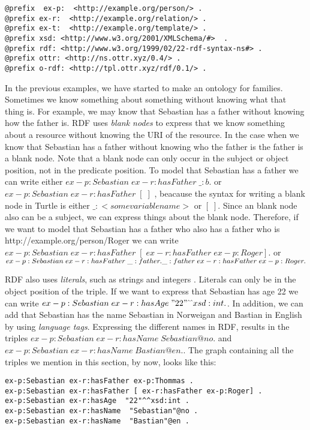\begin{lstlisting}[frame=single, language=turtle]
@prefix  ex-p:  <http://example.org/person/> . 
@prefix ex-r:  <http://example.org/relation/> . 
@prefix ex-t:  <http://example.org/template/> . 
@prefix xsd: <http://www.w3.org/2001/XMLSchema/#>  . 
@prefix rdf: <http://www.w3.org/1999/02/22-rdf-syntax-ns#> .
@prefix ottr: <http://ns.ottr.xyz/0.4/> .
@prefix o-rdf: <http://tpl.ottr.xyz/rdf/0.1/> .
\end{lstlisting}

\para
In the previous examples, we have started to make an ontology for families. Sometimes we know something about something without knowing what that thing is. For example, we may know that Sebastian has a father without knowing how the father is. RDF uses \emph{blank nodes} to express that we know something about a resource without knowing the URI of the resource. In the case when we know that Sebastian has a father without knowing who the father is the father is a blank node. Note that a blank node can only  occur in the subject or object position, not in the predicate position. To model that Sebastian has a father we can write either $ex-p:Sebastian\; ex-r:hasFather\; \_:b .$ or $ex-p:Sebastian\; ex-r:hasFather\; [\; ]$ , beacause the syntax for writing a blank node in Turtle is either $\_:<some variable name>$ or $[\; ]$. Since an blank node also can be a subject, we can express things about the blank node. Therefore, if we want to model that Sebastian has a father who also has a father who is http://example.org/person/Roger we can write $ex-p:Sebastian\; ex-r:hasFather\; [\; ex-r:hasFather\; ex-p:Roger] .$ or $ex-p:Sebastian\; ex-r:hasFather\; \_:father . \\ \_:father \; ex-r:hasFather\; ex-p:Roger .$

\para
RDF also uses \emph{literals}, such as strings and integers \autocite{W3C_RDF}. Literals can only be in the object position of the triple. If we want to express that Sebastian has age 22 we can write $ex-p:Sebastian\; ex-r:hasAge\; " 22 " \hat{\ }\hat{\ }xsd:int.$. In addition, we can add that Sebastian has the name Sebastian in Norweigan and Bastian in English by using \emph{language tags}. Expressing the different names in RDF, results in the triples $ex-p:Sebastian\; ex-r:hasName\; Sebastian@no.$ and $ex-p:Sebastian\; ex-r:hasName\; Bastian@en.$. The graph containing all the triples we mention in this section, by now, looks like this:

\begin{lstlisting}[frame=single, language=turtle]
ex-p:Sebastian ex-r:hasFather ex-p:Thommas .
ex-p:Sebastian ex-r:hasFather [ ex-r:hasFather ex-p:Roger] . 
ex-p:Sebastian ex-r:hasAge  "22"^^xsd:int . 
ex-p:Sebastian ex-r:hasName  "Sebastian"@no . 
ex-p:Sebastian ex-r:hasName  "Bastian"@en .
\end{lstlisting}

